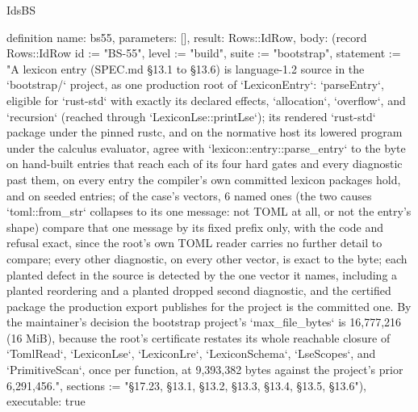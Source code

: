 \begin{lexlean}{IdsBS}
\begin{semanticmodule}
definition{
  name: bs55,
  parameters: [],
  result: Rows::IdRow,
  body: (record Rows::IdRow {id := "BS-55", level := "build", suite := "bootstrap", statement := "A lexicon entry (SPEC.md §13.1 to §13.6) is language-1.2 source in the `bootstrap/` project, as one production root of `LexiconEntry`: `parseEntry`, eligible for `rust-std` with exactly its declared effects, `allocation`, `overflow`, and `recursion` (reached through `LexiconLse::printLse`); its rendered `rust-std` package under the pinned rustc, and on the normative host its lowered program under the calculus evaluator, agree with `lexicon::entry::parse_entry` to the byte on hand-built entries that reach each of its four hard gates and every diagnostic past them, on every entry the compiler's own committed lexicon packages hold, and on seeded entries; of the case's vectors, 6 named ones (the two causes `toml::from_str` collapses to its one message: not TOML at all, or not the entry's shape) compare that one message by its fixed prefix only, with the code and refusal exact, since the root's own TOML reader carries no further detail to compare; every other diagnostic, on every other vector, is exact to the byte; each planted defect in the source is detected by the one vector it names, including a planted reordering and a planted dropped second diagnostic, and the certified package the production export publishes for the project is the committed one. By the maintainer's decision the bootstrap project's `max_file_bytes` is 16,777,216 (16 MiB), because the root's certificate restates its whole reachable closure of `TomlRead`, `LexiconLse`, `LexiconLre`, `LexiconSchema`, `LseScopes`, and `PrimitiveScan`, once per function, at 9,393,382 bytes against the project's prior 6,291,456.", sections := "§17.23, §13.1, §13.2, §13.3, §13.4, §13.5, §13.6"}),
  executable: true
}
\end{semanticmodule}
\end{lexlean}
